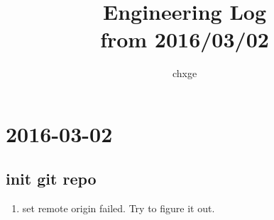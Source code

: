 \documentclass{ctexart}
\begin{document}
\title{%
	Engineering Log\\ \small from 2016/03/02}
\author{%
	chxge}
\maketitle

\tableofcontents
	
\section[03/02]{2016-03-02}
	\subsection{init git repo}
		\begin{enumerate}
			\item <21:11>set remote origin failed. Try to figure it out.
		\end{enumerate}
\end{document}
